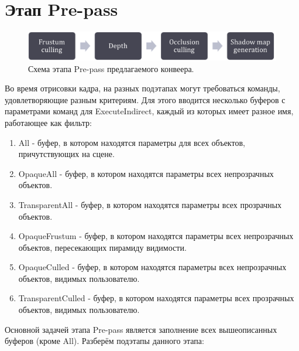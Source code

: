 \section{Этап Pre-pass} \label{ch3:pre_pass}
	\begin{figure}[ht!] 
		\center
		\includegraphics [scale=0.4] {my_folder/images//prepass_schema}	
		\caption{Схема этапа Pre-pass предлагаемого конвеера.} 
		\label{fig:prepass_schema}
	\end{figure}
	
	Во время отрисовки кадра, на разных подэтапах могут требоваться команды, удовлетворяющие разным критериям. Для этого вводится несколько буферов с параметрами команд для ExecuteIndirect, каждый из которых имеет разное имя, работающее как фильтр:
	\begin{enumerate}[1.]
		\item All - буфер, в котором находятся параметры для всех объектов, причутствующих на сцене.
		\item OpaqueAll - буфер, в котором находятся параметры всех непрозрачных объектов.
		\item TransparentAll - буфер, в котором находятся параметры всех прозрачных объектов.
		\item OpaqueFrustum - буфер, в котором находятся параметры всех непрозрачных объектов, пересекающих пирамиду видимости.
		\item OpaqueCulled - буфер, в котором находятся параметры всех непрозрачных объектов, видимых пользователю.
		\item TransparentCulled - буфер, в котором находятся параметры всех прозрачных объектов, видимых пользователю.
	\end{enumerate}
	
	Основной задачей этапа Pre-pass является заполнение всех вышеописанных буферов (кроме All). Разберём подэтапы данного этапа:
